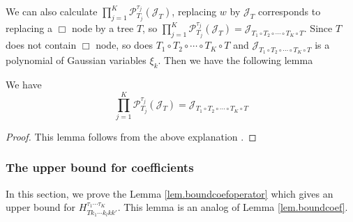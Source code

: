 We can also calculate $\prod_{j=1}^K\mathcal{P}^{\tau_j}_{T_j}(\mathcal{J}_{T})$, replacing $w$ by $\mathcal{J}_{T}$ corresponds to replacing a $\Box$ node by a tree $T$, so $\prod_{j=1}^K\mathcal{P}^{\tau_j}_{T_j}(\mathcal{J}_{T})=\mathcal{J}_{T_1\circ T_2\circ \cdots\circ T_K\circ T}$. Since $T$ does not contain $\Box$ node, so does $T_1\circ T_2\circ \cdots\circ T_K\circ T$ and $\mathcal{J}_{T_1\circ T_2\circ \cdots\circ T_K\circ T}$ is a polynomial of Gaussian variables $\xi_k$. Then we have the following lemma
\begin{lem}
We have 
\begin{equation}\label{eq.operatoreqsimpleJ_T}
    \prod_{j=1}^K\mathcal{P}^{\tau_j}_{T_j}(\mathcal{J}_{T})=\mathcal{J}_{T_1\circ T_2\circ \cdots\circ T_K\circ T}
\end{equation}
\end{lem}
\begin{proof}
This lemma follows from the above explanation .
\end{proof}



\subsubsection{The upper bound for coefficients} In this section, we prove the Lemma \ref{lem.boundcoefoperator} which gives an upper bound for $H^{\tau_1\cdots \tau_{K}}_{Tk_1\cdots k_{l}kk'}$. This lemma is an analog of Lemma \ref{lem.boundcoef}.

